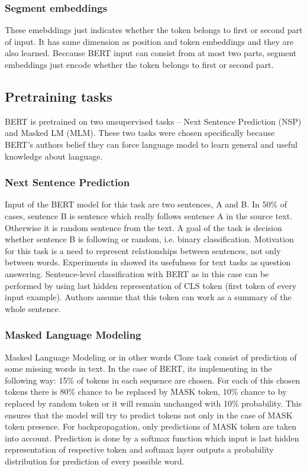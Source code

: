 \subsubsection*{Segment embeddings}
These emebddings just indicates whether the token belongs to first or second part of input. It has same dimension as position and token embeddings and they are also learned. Beccause BERT input can consist from at most two parts, segment embeddings just encode whether the token belongs to first or second part.

\subsection{Pretraining tasks}

BERT is pretrained on two unsupervised tasks -- Next Sentence Prediction (NSP) and Masked LM (MLM). These two tasks were chosen specifically because BERT's authors belief they can force language model to learn general and useful knowledge about language. 

\subsubsection*{Next Sentence Prediction}
Input of the BERT model for this task are two sentences, A and B. In 50\% of cases, sentence B is sentence which really follows sentence A in the source text. Otherwise it is random sentence from the text. A goal of the task is decision whether sentence B is following or random, i.e. binary classification. Motivation for this task is a need to represent relationships between sentences, not only between words. Experiments in \citep{
Devlin2019} showed its usefulness for text tasks as question answering. Sentence-level classification with BERT as in this case can be performed by using last hidden representation of CLS token (first token of every input example). Authors assume that this token can work as a summary of the whole sentence.

\subsubsection*{Masked Language Modeling}
Masked Language Modeling or in other words Cloze task \citep{Taylor1953}
consist of prediction of some missing words in text. In the case of BERT, its implementing in the following way: 15\% of tokens in each sequence are chosen. For each of this chosen tokens there is 80\% chance to be replaced by MASK token, 10\% chance to by replaced by random token or it will remain unchanged with 10\% probability. This ensures that the model will try to predict tokens not only in the case of MASK token presence. For backpropagation, only predictions of MASK token are taken into account. Prediction is done by a softmax function which input is last hidden representation of respective token and softmax layer outputs a probability distribution for prediction of every possible word.


